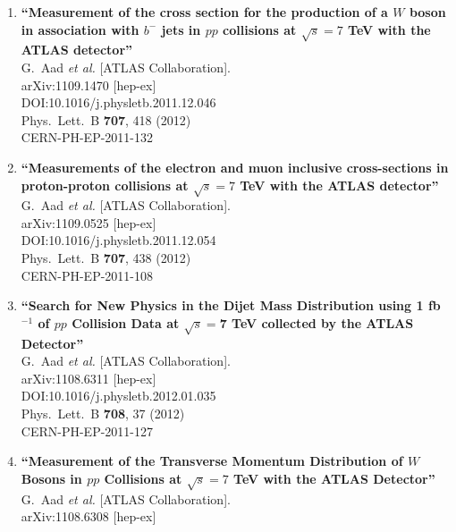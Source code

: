 \documentclass{article}
\begin{document}
\begin{enumerate}
\item%
{\bf ``Measurement of the cross section for the production of a $W$ boson in association with $b^-$ jets in $pp$ collisions at $\sqrt{s}=7$ TeV with the ATLAS detector''}
  \\{}G.~Aad {\it et al.} [ATLAS Collaboration].
  \\{}arXiv:1109.1470 [hep-ex]
  \\{}DOI:10.1016/j.physletb.2011.12.046
  \\{}Phys.\ Lett.\ B {\bf 707}, 418 (2012)
  \\{}CERN-PH-EP-2011-132
\item%
{\bf ``Measurements of the electron and muon inclusive cross-sections in proton-proton collisions at $\sqrt{s}=7$ TeV with the ATLAS detector''}
  \\{}G.~Aad {\it et al.} [ATLAS Collaboration].
  \\{}arXiv:1109.0525 [hep-ex]
  \\{}DOI:10.1016/j.physletb.2011.12.054
  \\{}Phys.\ Lett.\ B {\bf 707}, 438 (2012)
  \\{}CERN-PH-EP-2011-108
\item%
{\bf ``Search for New Physics in the Dijet Mass Distribution using 1 fb$^{-1}$ of $pp$ Collision Data at $\sqrt{s}=$7 TeV collected by the ATLAS Detector''}
  \\{}G.~Aad {\it et al.} [ATLAS Collaboration].
  \\{}arXiv:1108.6311 [hep-ex]
  \\{}DOI:10.1016/j.physletb.2012.01.035
  \\{}Phys.\ Lett.\ B {\bf 708}, 37 (2012)
  \\{}CERN-PH-EP-2011-127
\item%
{\bf ``Measurement of the Transverse Momentum Distribution of $W$ Bosons in $pp$ Collisions at $\sqrt{s}=7$ TeV with the ATLAS Detector''}
  \\{}G.~Aad {\it et al.} [ATLAS Collaboration].
  \\{}arXiv:1108.6308 [hep-ex]

\end{enumerate}
\end{document}
